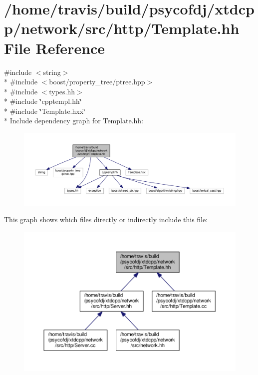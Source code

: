 \hypertarget{Template_8hh}{\section{/home/travis/build/psycofdj/xtdcpp/network/src/http/\-Template.hh File Reference}
\label{Template_8hh}
}
{\ttfamily \#include $<$string$>$}\\*
{\ttfamily \#include $<$boost/property\-\_\-tree/ptree.\-hpp$>$}\\*
{\ttfamily \#include $<$types.\-hh$>$}\\*
{\ttfamily \#include \char`\"{}cpptempl.\-hh\char`\"{}}\\*
{\ttfamily \#include \char`\"{}Template.\-hxx\char`\"{}}\\*
Include dependency graph for Template.\-hh\-:
\nopagebreak
\begin{figure}[H]
\begin{center}
\leavevmode
\includegraphics[width=350pt]{Template_8hh__incl}
\end{center}
\end{figure}
This graph shows which files directly or indirectly include this file\-:
\nopagebreak
\begin{figure}[H]
\begin{center}
\leavevmode
\includegraphics[width=350pt]{Template_8hh__dep__incl}
\end{center}
\end{figure}
